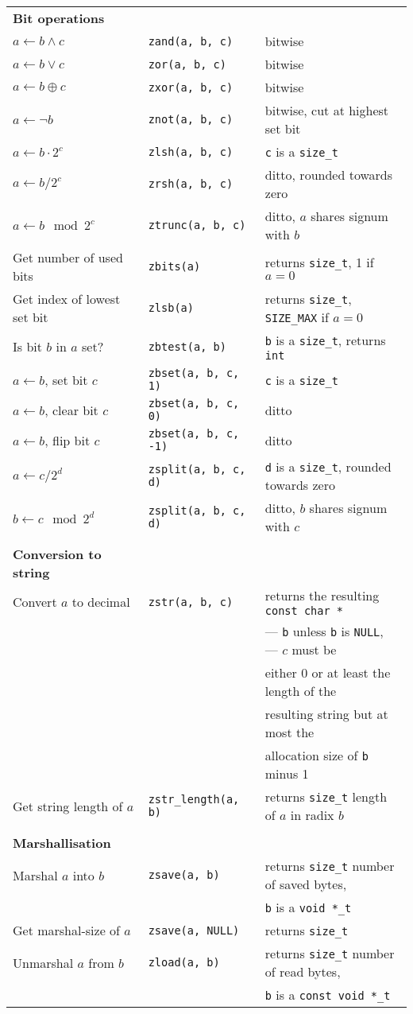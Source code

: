 \documentclass[10pt,draft]{article}
\newcommand{\size}{{\tt size\_t}}
\newcommand{\ullong}{{\tt unsigned long long int}}
\newcommand{\entry}[3]{ #2 & {\tt #1} & #3 \\ }
\newcommand{\cont}[1]{ & & #1 \\ }
\begin{document}
\begin{tabular}{lll}



\textbf{Bit operations} \\
\entry{zand(a, b, c)}      {$a \gets b \wedge c$}         {bitwise}
\entry{zor(a, b, c)}       {$a \gets b \vee c$}           {bitwise}
\entry{zxor(a, b, c)}      {$a \gets b \oplus c$}         {bitwise}
\entry{znot(a, b, c)}      {$a \gets \lnot b$}            {bitwise, cut at highest set bit}
\entry{zlsh(a, b, c)}      {$a \gets b \cdot 2^c$}        {{\tt c} is a \size{}}
\entry{zrsh(a, b, c)}      {$a \gets b / 2^c$}            {ditto, rounded towards zero}
\entry{ztrunc(a, b, c)}    {$a \gets b \mod 2^c$}         {ditto, $a$ shares signum with $b$}
\entry{zbits(a)}           {Get number of used bits}      {returns \size{}, 1 if $a = 0$}
\entry{zlsb(a)}            {Get index of lowest set bit}  {returns \size{}, {\tt SIZE\_MAX} if $a = 0$}
\entry{zbtest(a, b)}       {Is bit $b$ in $a$ set?}       {{\tt b} is a \size{}, returns {\tt int}}
\entry{zbset(a, b, c, 1)}  {$a \gets b$, set bit $c$}     {{\tt c} is a \size{}}
\entry{zbset(a, b, c, 0)}  {$a \gets b$, clear bit $c$}   {ditto}
\entry{zbset(a, b, c, -1)} {$a \gets b$, flip bit $c$}    {ditto}
\entry{zsplit(a, b, c, d)} {$a \gets c / 2^d$}            {{\tt d} is a \size{}, rounded towards zero}
\entry{zsplit(a, b, c, d)} {$b \gets c \mod 2^d$}         {ditto, $b$ shares signum with $c$}
\\

\textbf{Conversion to string} \\
\entry{zstr(a, b, c)}           {Convert $a$ to decimal}   {returns the resulting {\tt const char *}}
\cont                                                      {--- {\tt b} unless {\tt b} is
                                                                {\tt NULL}, --- $c$ must be}
\cont                                                      {either 0 or at least the length of the}
\cont                                                      {resulting string but at most the}
\cont                                                      {allocation size of {\tt b} minus 1}
\entry{zstr\_length(a, b)}      {Get string length of $a$} {returns \size{} length of $a$ in radix $b$}
\\

\textbf{Marshallisation} \\
\entry{zsave(a, b)}    {Marshal $a$ into $b$}    {returns \size{} number of saved bytes,}
\cont                                            {{\tt b} is a {\tt void *\_t}}
\entry{zsave(a, NULL)} {Get marshal-size of $a$} {returns \size{}}
\entry{zload(a, b)}    {Unmarshal $a$ from $b$}  {returns \size{} number of read bytes,}
\cont                                            {{\tt b} is a {\tt const void *\_t}}


\end{tabular}
\end{document}
